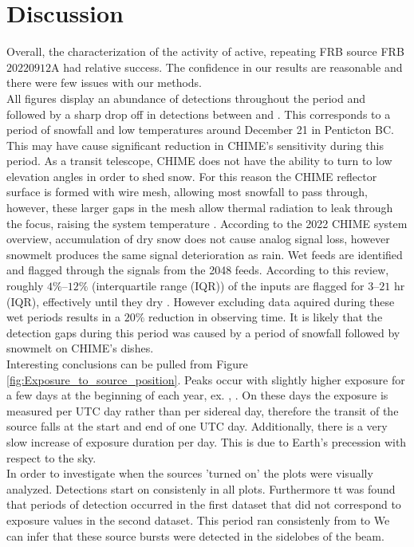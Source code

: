 \documentclass[twocolumn]{aastex631}
\begin{document}
\section{Discussion}
\label{sec:Discussion}

Overall, the characterization of the activity of active, repeating FRB source FRB$20220912$A had relative success. The confidence in our results are reasonable and there were few issues with our methods.\\
\indent All figures display an abundance of detections throughout the period  and  followed by a sharp drop off in detections between  and . This corresponds to a period of snowfall and low temperatures around December 21 in Penticton BC. This may have cause significant reduction in CHIME's sensitivity during this period. As a transit telescope, CHIME does not have the ability to turn to low elevation angles in order to shed snow. For this reason the CHIME reflector surface is formed with wire mesh, allowing most snowfall to pass through, however, these larger gaps in the mesh allow thermal radiation to leak through the focus, raising the system temperature \citep{amiri2022overview}. According to the 2022 CHIME system overview, accumulation of dry snow does not cause analog signal loss, however snowmelt produces the same signal deterioration as rain. Wet feeds are identified and flagged through the signals from the 2048 feeds. According to this review, roughly $4\%–12\%$ (interquartile range (IQR)) of the inputs are flagged for $3–21$ hr (IQR), effectively until they dry \citep{amiri2022overview}. However excluding data aquired during these wet periods results in a $20\%$ reduction in observing time. It is likely that the detection gaps during this period was caused by a period of snowfall followed by snowmelt on CHIME's dishes.\\
\indent Interesting conclusions can be pulled from Figure \ref{fig:Exposure_to_source_position}. Peaks occur with slightly higher exposure for a few days at the beginning of each year, ex. , . On these days the exposure is measured per UTC day rather than per sidereal day, therefore the transit of the source falls at the start and end of one UTC day. Additionally, there is a very slow increase of exposure duration per day. This is due to Earth's precession with respect to the sky.\\
\indent In order to investigate when the sources 'turned on' the plots were visually analyzed. Detections start on  consistenly in all plots. Furthermore tt was found that periods of detection occurred in the first dataset that did not correspond to exposure values in the second dataset. This period ran consistenly from  to  We can infer that these source bursts were detected in the sidelobes of the beam.\\
\end{document}
